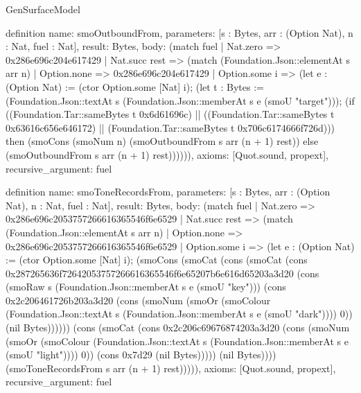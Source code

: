 \begin{lexlean}{GenSurfaceModel}
\begin{semanticmodule}
definition{
  name: smoOutboundFrom,
  parameters: [s : Bytes, arr : (Option Nat), n : Nat, fuel : Nat],
  result: Bytes,
  body: (match fuel
    | Nat.zero => 0x286e696c204e617429
    | Nat.succ rest => (match (Foundation.Json::elementAt s arr n)
      | Option.none => 0x286e696c204e617429
      | Option.some i => (let e : (Option Nat) := (ctor Option.some [Nat] i); (let t : Bytes := (Foundation.Json::textAt s (Foundation.Json::memberAt s e (smoU "target"))); (if ((Foundation.Tar::sameBytes t 0x6d61696c) || ((Foundation.Tar::sameBytes t 0x63616c656e646172) || (Foundation.Tar::sameBytes t 0x706c6174666f726d))) then (smoCons (smoNum n) (smoOutboundFrom s arr (n + 1) rest)) else (smoOutboundFrom s arr (n + 1) rest)))))),
  axioms: [Quot.sound, propext],
  recursive_argument: fuel
}

definition{
  name: smoToneRecordsFrom,
  parameters: [s : Bytes, arr : (Option Nat), n : Nat, fuel : Nat],
  result: Bytes,
  body: (match fuel
    | Nat.zero => 0x286e696c2053757266616365546f6e6529
    | Nat.succ rest => (match (Foundation.Json::elementAt s arr n)
      | Option.none => 0x286e696c2053757266616365546f6e6529
      | Option.some i => (let e : (Option Nat) := (ctor Option.some [Nat] i); (smoCons (smoCat (cons (smoCat (cons 0x287265636f72642053757266616365546f6e65207b6e616d65203a3d20 (cons (smoRaw s (Foundation.Json::memberAt s e (smoU "key"))) (cons 0x2c206461726b203a3d20 (cons (smoNum (smoOr (smoColour (Foundation.Json::textAt s (Foundation.Json::memberAt s e (smoU "dark")))) 0)) (nil Bytes)))))) (cons (smoCat (cons 0x2c206c69676874203a3d20 (cons (smoNum (smoOr (smoColour (Foundation.Json::textAt s (Foundation.Json::memberAt s e (smoU "light")))) 0)) (cons 0x7d29 (nil Bytes))))) (nil Bytes)))) (smoToneRecordsFrom s arr (n + 1) rest))))),
  axioms: [Quot.sound, propext],
  recursive_argument: fuel
}


\end{semanticmodule}
\end{lexlean}
